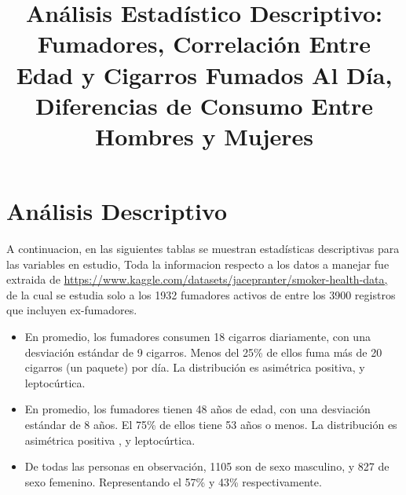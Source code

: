 \documentclass[
  stu,
  longtable,
  nolmodern,
  notxfonts,
  notimes,
  colorlinks=true,linkcolor=blue,citecolor=blue,urlcolor=blue]{apa7}
\title{Análisis Estadístico Descriptivo: Fumadores, Correlación Entre
Edad y Cigarros Fumados Al Día, Diferencias de Consumo Entre Hombres y
Mujeres}
\begin{document}
\maketitle


\setcounter{secnumdepth}{-\maxdimen} %

\setlength\LTleft{0pt}


\section{Análisis Descriptivo}\label{anuxe1lisis-descriptivo}

A continuacion, en las siguientes tablas se muestran estadísticas
descriptivas para las variables en estudio, Toda la informacion respecto
a los datos a manejar fue extraida de
\url{https://www.kaggle.com/datasets/jacepranter/smoker-health-data,} de
la cual se estudia solo a los 1932 fumadores activos de entre los 3900
registros que incluyen ex-fumadores.

\begin{itemize}
\item
  En promedio, los fumadores consumen 18 cigarros diariamente, con una
  desviación estándar de 9 cigarros. Menos del 25\% de ellos fuma más de
  20 cigarros (un paquete) por día. La distribución es asimétrica
  positiva, y leptocúrtica.
\item
  En promedio, los fumadores tienen 48 años de edad, con una desviación
  estándar de 8 años. El 75\% de ellos tiene 53 años o menos. La
  distribución es asimétrica positiva , y leptocúrtica.
\item
  De todas las personas en observación, 1105 son de sexo masculino, y
  827 de sexo femenino. Representando el 57\% y 43\% respectivamente.
\end{itemize}
\end{document}

